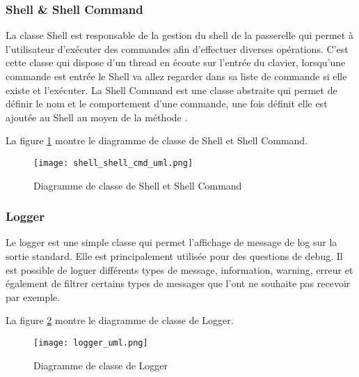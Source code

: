 \subsubsection{Shell \& Shell Command}

La classe Shell est responsable de la gestion du shell de la passerelle qui permet à l'utilisateur d'exécuter des commandes afin d'effectuer diverses opérations. C'est cette classe qui dispose d'un thread en écoute sur l'entrée du clavier, lorsqu'une commande est entrée le Shell va allez regarder dans sa liste de commande si elle existe et l'exécuter.
La Shell Command est une classe abstraite qui permet de définir le nom et le comportement d'une commande, une fois définit elle est ajoutée au Shell au moyen de la méthode .

La figure \ref{fig:shell_shell_cmd_uml} montre le diagramme de classe de Shell et Shell Command.

\begin{figure}[htb]
\centering 
\texttt{[image: shell\_shell\_cmd\_uml.png]} 
\caption{Diagramme de classe de Shell et Shell Command}
\label{fig:shell_shell_cmd_uml}
 \end{figure}

\subsubsection{Logger}

Le logger est une simple classe qui permet l'affichage de message de log sur la sortie standard. Elle est principalement utilisée pour des questions de debug. Il est possible de loguer différents types de message, information, warning, erreur et également de filtrer certains types de messages que l'ont ne souhaite pas recevoir par exemple.

La figure \ref{fig:logger_uml} montre le diagramme de classe de Logger.

\begin{figure}[htb]
\centering 
\texttt{[image: logger\_uml.png]} 
\caption{Diagramme de classe de Logger}
\label{fig:logger_uml}
 \end{figure}
